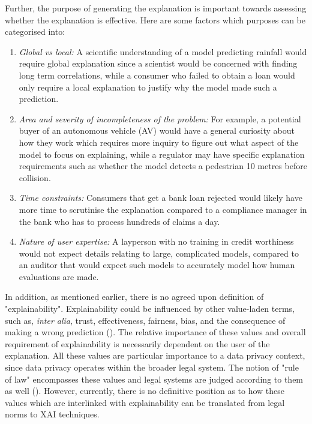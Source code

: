Further, the purpose of generating the explanation is important towards assessing whether the explanation is effective. Here are some factors which purposes can be categorised into:
\begin{enumerate}
	\item \textit{Global vs local:} A scientific understanding of a model predicting rainfall would require global explanation since a scientist would be concerned with finding long term correlations, while a consumer who failed to obtain a loan would only require a local explanation to justify why the model made such a prediction.
	\item \textit{Area and severity of incompleteness of the problem:} For example, a potential buyer of an autonomous vehicle (AV) would have a general curiosity about how they work which requires more inquiry to figure out what aspect of the model to focus on explaining, while a regulator may have specific explanation requirements such as whether the model detects a pedestrian 10 metres before collision.
	\item \textit{Time constraints:} Consumers that get a bank loan rejected would likely have more time to scrutinise the explanation compared to a compliance manager in the bank who has to process hundreds of claims a day.
	\item \textit{Nature of user expertise:} A layperson with no training in credit worthiness would not expect details relating to large, complicated models, compared to an auditor that would expect such models to accurately model how human evaluations are made.
\end{enumerate}

In addition, as mentioned earlier, there is no agreed upon definition of "explainability". Explainability could be influenced by other value-laden terms, such as, \textit{inter alia}, trust, effectiveness, fairness, bias, and the consequence of making a wrong prediction (\cite{rosenfeld2021}). The relative importance of these values and overall requirement of explainability is necessarily dependent on the user of the explanation. All these values are particular importance to a data privacy context, since data privacy operates within the broader legal system. The notion of "rule of law" encompasses these values and legal systems are judged according to them as well (\cite{greenstein2022}). However, currently, there is no definitive position as to how these values which are interlinked with explainability can be translated from legal norms to XAI techniques.

